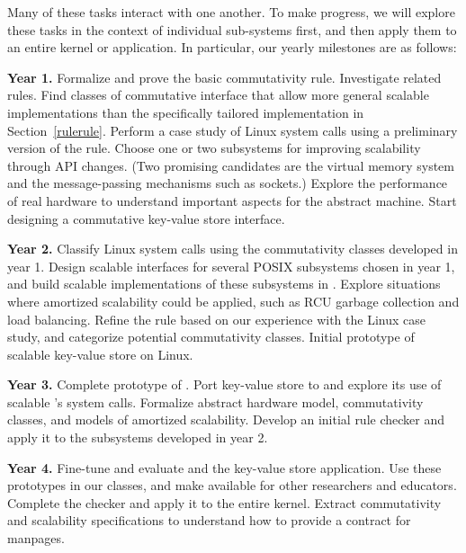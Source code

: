 Many of these tasks interact with one another.  To make progress, we
will explore these tasks in the context of individual sub-systems first,
and then apply them to an entire kernel or application.  In particular,
our yearly milestones are as follows:

\begin{CompactItemize}
\item {\bf Year 1.}
Formalize and prove the basic commutativity rule.
%
Investigate related rules. Find classes of commutative
interface that allow more general scalable implementations than the
specifically tailored implementation in Section~\ref{rulerule}.
%
Perform a case study of Linux system calls using a preliminary version
of the rule.  Choose one or two subsystems for improving scalability
through API changes.  (Two promising candidates are the virtual memory
system and the message-passing mechanisms such as sockets.)
Explore the performance of real hardware to understand important aspects
for the abstract machine.
Start designing a commutative key-value store interface.

\item {\bf Year 2.}
Classify Linux system calls using the commutativity classes developed
in year 1.
Design scalable interfaces for several POSIX subsystems chosen in year 1,
and build scalable implementations of these subsystems in \sys.
Explore situations where amortized scalability could be applied, such
as RCU garbage collection and load balancing.
Refine the rule based on our experience with the Linux case study,
and categorize potential commutativity classes.
Initial prototype of scalable key-value store on Linux.

\item {\bf Year 3.} 
Complete prototype of \sys.  Port key-value store to \sys and explore
its use of scalable \sys's system calls.  Formalize abstract
hardware model, commutativity classes, and models of amortized
scalability.  Develop an initial rule checker and apply it to the
subsystems developed in year 2.

\item {\bf Year 4.} 
Fine-tune and evaluate \sys and the key-value store application.
Use these prototypes in our classes, and make available for other
researchers and educators.  Complete the checker and apply it to the
entire kernel.  Extract commutativity and scalability specifications to
understand how to provide a contract for manpages.

\end{CompactItemize}

